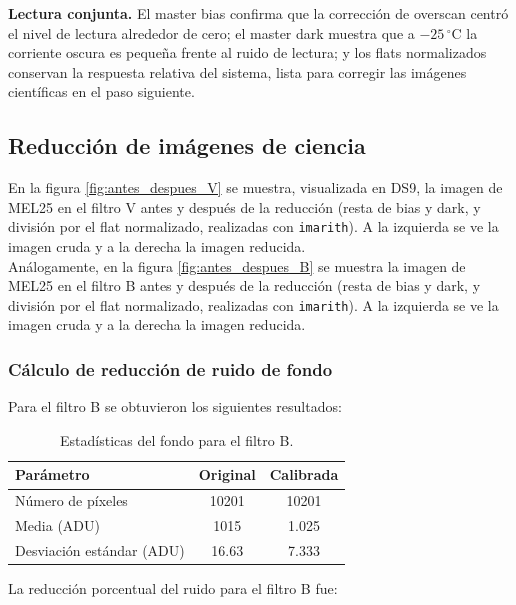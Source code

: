 \documentclass[10pt,a4paper,twocolumn]{article}
\begin{document}
\noindent\textbf{Lectura conjunta.} El master bias confirma que la
corrección de overscan centró el nivel de lectura alrededor de cero; el
master dark muestra que a $-25\,^{\circ}$C la corriente oscura es pequeña
frente al ruido de lectura; y los flats normalizados conservan la respuesta
relativa del sistema, lista para corregir las imágenes científicas en el paso
siguiente.

\subsection{Reducción de imágenes de ciencia}

En la figura \ref{fig:antes_despues_V} se muestra, visualizada en DS9, la imagen de MEL25 en el filtro V antes y después de la reducción (resta de bias y dark, y división por el flat normalizado, realizadas con \texttt{imarith}). A la izquierda se ve la imagen cruda y a la derecha la imagen reducida.\\

Análogamente, en la figura \ref{fig:antes_despues_B} se muestra   la imagen de MEL25 en el filtro B antes y después de la reducción (resta de bias y dark, y división por el flat normalizado, realizadas con \texttt{imarith}). A la izquierda se ve la imagen cruda y a la derecha la imagen reducida.\\
\medskip


\subsubsection{Cálculo de reducción de ruido de fondo}
Para el filtro B se obtuvieron los siguientes resultados:

\begin{table}[h!]
\centering
\caption{Estadísticas del fondo para el filtro B.}
\begin{tabular}{lcc}
\hline
\textbf{Parámetro} & \textbf{Original} & \textbf{Calibrada} \\
\hline
Número de píxeles & 10201 & 10201 \\
Media (ADU) & 1015 & 1.025 \\
Desviación estándar (ADU) & 16.63 & 7.333 \\
\hline
\end{tabular}
\end{table}

La reducción porcentual del ruido para el filtro B fue:
\end{document}
